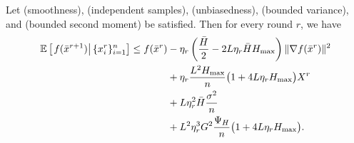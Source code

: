 \documentclass{article}
\newcommand{\ExpCond}[2]{{\mathbb{E}}\left[\left.#1\right\vert#2\right]}
\theoremstyle{plain}
\theoremstyle{definition}
\begin{document}
\begin{lemma}\label{lem:explicit_one_round}Let  (smoothness),  (independent samples),  (unbiasedness),  (bounded variance), and  (bounded second moment) be satisfied. Then for every round \(r\), we have
\begin{align}
\ExpCond{ f(\bar x^{r+1}) }{ \{x_i^r\}_{i=1}^n }
\leq
f(\bar x^r)
&-
\eta_r\left(\frac{\bar H}{2}-2L\eta_r \bar H H_{\max}\right)\|\nabla f(\bar x^r)\|^2
\notag\\
&
+
\eta_r\frac{L^2H_{\max}}{n}\bigl(1+4L\eta_r H_{\max}\bigr)X^{r} \notag \\
&
+
L\eta_r^2\bar H\frac{\sigma^2}{n}
\notag\\
&
+
L^2\eta_r^3G^2\frac{\Psi_H}{n}\bigl(1+4L\eta_r H_{\max}\bigr).
\label{eq:98y80_098yu0fd_0yhgfdf}
\end{align}
\end{lemma}
\end{document}
